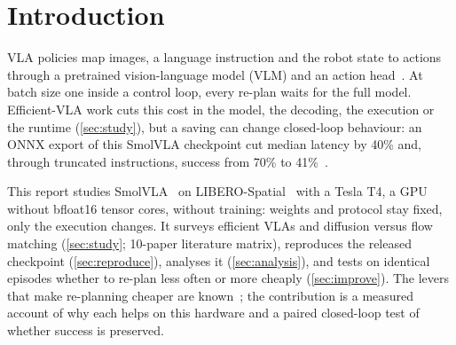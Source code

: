 \section{Introduction}
\label{sec:intro}

VLA policies map images, a language instruction and the robot state to actions through a pretrained vision-language model (VLM) and an action head~\cite{black2024pi_0,shukor2025smolvla}.
At batch size one inside a control loop, every re-plan waits for the full model.
Efficient-VLA work cuts this cost in the model, the decoding, the execution or the runtime (\cref{sec:study}), but a saving can change closed-loop behaviour: an ONNX export of this SmolVLA checkpoint cut median latency by 40\% and, through truncated instructions, success from 70\% to 41\%~\cite{islam2026faster}.

This report studies SmolVLA~\cite{shukor2025smolvla} on LIBERO-Spatial~\cite{liu2023libero} with a Tesla T4, a GPU without bfloat16 tensor cores, without training: weights and protocol stay fixed, only the execution changes.
It surveys efficient VLAs and diffusion versus flow matching (\cref{sec:study}; 10-paper literature matrix), reproduces the released checkpoint (\cref{sec:reproduce}), analyses it (\cref{sec:analysis}), and tests on identical episodes whether to re-plan less often or more cheaply (\cref{sec:improve}).
The levers that make re-planning cheaper are known~\cite{ma2025running,tang2026fewer}; the contribution is a measured account of why each helps on this hardware and a paired closed-loop test of whether success is preserved.
